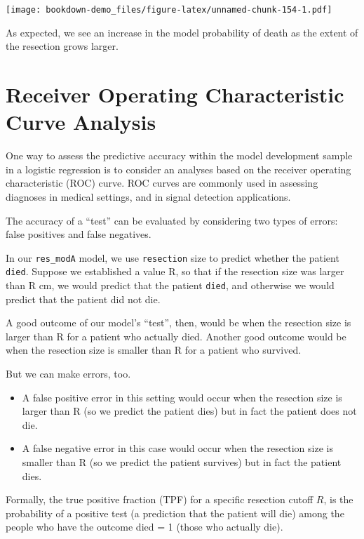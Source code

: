 \documentclass[]{book}
\providecommand{\tightlist}{%
  \setlength{\itemsep}{0pt}\setlength{\parskip}{0pt}}
\theoremstyle{definition}
\theoremstyle{definition}
\theoremstyle{definition}
\theoremstyle{remark}
\begin{document}
\texttt{[image: bookdown-demo\_files/figure-latex/unnamed-chunk-154-1.pdf]}

As expected, we see an increase in the model probability of death as the
extent of the resection grows larger.

\section{Receiver Operating Characteristic Curve
Analysis}\label{receiver-operating-characteristic-curve-analysis}

One way to assess the predictive accuracy within the model development
sample in a logistic regression is to consider an analyses based on the
receiver operating characteristic (ROC) curve. ROC curves are commonly
used in assessing diagnoses in medical settings, and in signal detection
applications.

The accuracy of a ``test'' can be evaluated by considering two types of
errors: false positives and false negatives.

In our \texttt{res\_modA} model, we use \texttt{resection} size to
predict whether the patient \texttt{died}. Suppose we established a
value R, so that if the resection size was larger than R cm, we would
predict that the patient \texttt{died}, and otherwise we would predict
that the patient did not die.

A good outcome of our model's ``test'', then, would be when the
resection size is larger than R for a patient who actually died. Another
good outcome would be when the resection size is smaller than R for a
patient who survived.

But we can make errors, too.

\begin{itemize}
\tightlist
\item
  A false positive error in this setting would occur when the resection
  size is larger than R (so we predict the patient dies) but in fact the
  patient does not die.
\item
  A false negative error in this case would occur when the resection
  size is smaller than R (so we predict the patient survives) but in
  fact the patient dies.
\end{itemize}

Formally, the true positive fraction (TPF) for a specific resection
cutoff \(R\), is the probability of a positive test (a prediction that
the patient will die) among the people who have the outcome died = 1
(those who actually die).
\end{document}
